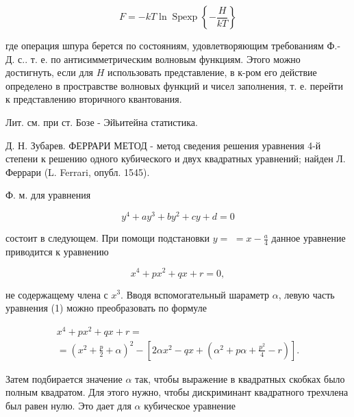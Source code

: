 \documentclass[10pt]{article}
\begin{document}
\[

F=-k T \ln \operatorname{Spexp}\left\{-\frac{H}{k T}\right\}

\]



где операция шпура берется по состояниям, удовлетворяющим требованиям Ф.- Д. с.. т. е. по антисимметрическим волновым функциям. Этого можно достигнуть, если для $H$ использовать представление, в к-ром его действие определено в простравстве волновых функций и чисел заполнения, т. е. перейти к представлению вторичного квантования.



Лит. см. при ст. Бозе - Эй̈ьитейна статистика.



Д. Н. Зубарев. ФЕРРАРИ МЕТОД - метод сведения решения уравнения 4-й степени к решению одного кубического и двух квадратных уравнений; найден Л. Феррари (L. Ferrari, опубл. 1545).



Ф. м. для уравнения



\[

y^{4}+a y^{3}+b y^{2}+c y+d=0

\]



состоит в следующем. При помощи подстановки $y=$ $=x-\frac{a}{4}$ данное уравнение приводится $к$ уравнению



\[

x^{4}+p x^{2}+q x+r=0,

\]



не содержащему члена с $x^{3}$. Вводя вспомогательный шараметр $\alpha$, левую часть уравнения (1) можно преобразовать по формуле



\[

\begin{gathered}

x^{4}+p x^{2}+q x+r= \\

=\left(x^{2}+\frac{p}{2}+\alpha\right)^{2}-\left[2 \alpha x^{2}-q x+\left(\alpha^{2}+p \alpha+\frac{p^{2}}{4}-r\right)\right] .

\end{gathered}

\]



Затем подбирается значение $\alpha$ так, чтобы выражение в квадратных скобках было полным квадратом. Для этого нужно, чтобы дискриминант квадратного трехчлена был равен нулю. Это дает для $\alpha$ кубическое уравнение
\end{document}
